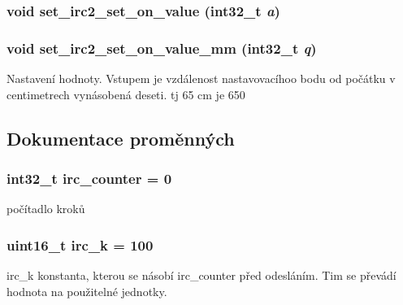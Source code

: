 \subsubsection[{set\_\-irc2\_\-set\_\-on\_\-value}]{\setlength{\rightskip}{0pt plus 5cm}void set\_\-irc2\_\-set\_\-on\_\-value (int32\_\-t {\em a})}\label{irc2_8c_a41a0bca6c07f8b1245a4b59a8209fce9}
\subsubsection[{set\_\-irc2\_\-set\_\-on\_\-value\_\-mm}]{\setlength{\rightskip}{0pt plus 5cm}void set\_\-irc2\_\-set\_\-on\_\-value\_\-mm (int32\_\-t {\em q})}\label{irc2_8c_a9d85c077b39fc2e091d54dcbfff72608}
Nastavení hodnoty. Vstupem je vzdálenost nastavovacíhoo bodu od počátku v centimetrech vynásobená deseti. tj 65 cm je 650 

\subsection{Dokumentace proměnných}
\subsubsection[{irc\_\-counter}]{\setlength{\rightskip}{0pt plus 5cm}int32\_\-t {\bf irc\_\-counter} = 0\hspace{0.3cm}{\ttfamily  [static]}}\label{irc2_8c_a2420ea5087a6c97e0f0e60946bb6bed2}


počítadlo kroků 
\subsubsection[{irc\_\-k}]{\setlength{\rightskip}{0pt plus 5cm}uint16\_\-t {\bf irc\_\-k} = 100\hspace{0.3cm}{\ttfamily  [static]}}\label{irc2_8c_a2823da0ac1f311c8b12078b236bbeb67}
irc\_\-k konstanta, kterou se násobí irc\_\-counter před odesláním. Tim se převádí hodnota na použitelné jednotky. 
